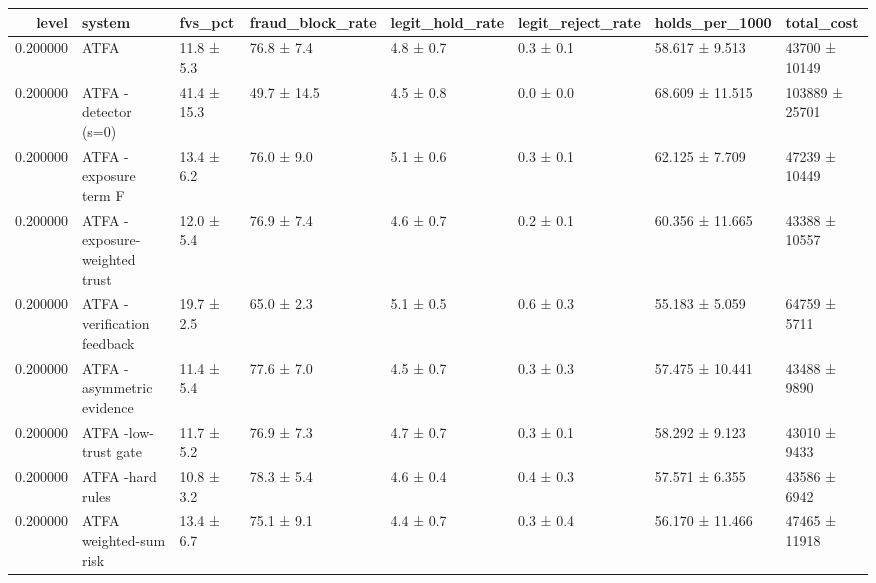 \begin{tabular}{rlllllll}
\toprule
level & system & fvs\_pct & fraud\_block\_rate & legit\_hold\_rate & legit\_reject\_rate & holds\_per\_1000 & total\_cost \\
\midrule
0.200000 & ATFA & 11.8 ± 5.3 & 76.8 ± 7.4 & 4.8 ± 0.7 & 0.3 ± 0.1 & 58.617 ± 9.513 & 43700 ± 10149 \\
0.200000 & ATFA -detector (s=0) & 41.4 ± 15.3 & 49.7 ± 14.5 & 4.5 ± 0.8 & 0.0 ± 0.0 & 68.609 ± 11.515 & 103889 ± 25701 \\
0.200000 & ATFA -exposure term F & 13.4 ± 6.2 & 76.0 ± 9.0 & 5.1 ± 0.6 & 0.3 ± 0.1 & 62.125 ± 7.709 & 47239 ± 10449 \\
0.200000 & ATFA -exposure-weighted trust & 12.0 ± 5.4 & 76.9 ± 7.4 & 4.6 ± 0.7 & 0.2 ± 0.1 & 60.356 ± 11.665 & 43388 ± 10557 \\
0.200000 & ATFA -verification feedback & 19.7 ± 2.5 & 65.0 ± 2.3 & 5.1 ± 0.5 & 0.6 ± 0.3 & 55.183 ± 5.059 & 64759 ± 5711 \\
0.200000 & ATFA -asymmetric evidence & 11.4 ± 5.4 & 77.6 ± 7.0 & 4.5 ± 0.7 & 0.3 ± 0.3 & 57.475 ± 10.441 & 43488 ± 9890 \\
0.200000 & ATFA -low-trust gate & 11.7 ± 5.2 & 76.9 ± 7.3 & 4.7 ± 0.7 & 0.3 ± 0.1 & 58.292 ± 9.123 & 43010 ± 9433 \\
0.200000 & ATFA -hard rules & 10.8 ± 3.2 & 78.3 ± 5.4 & 4.6 ± 0.4 & 0.4 ± 0.3 & 57.571 ± 6.355 & 43586 ± 6942 \\
0.200000 & ATFA weighted-sum risk & 13.4 ± 6.7 & 75.1 ± 9.1 & 4.4 ± 0.7 & 0.3 ± 0.4 & 56.170 ± 11.466 & 47465 ± 11918 \\
\bottomrule
\end{tabular}
